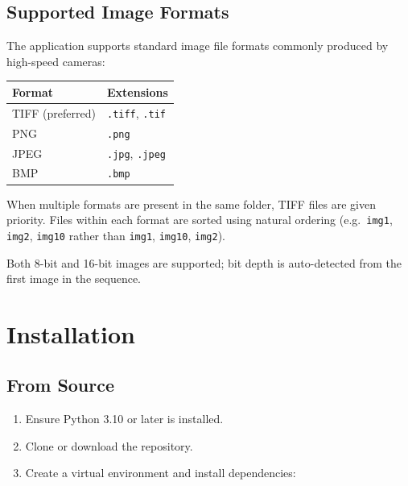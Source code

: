 \documentclass[11pt, letterpaper]{article}
\begin{document}
\subsection{Supported Image Formats}

The application supports standard image file formats commonly produced by
high-speed cameras:

\begin{center}
\begin{tabular}{ll}
    \toprule
    \textbf{Format} & \textbf{Extensions} \\
    \midrule
    TIFF (preferred) & \texttt{.tiff}, \texttt{.tif} \\
    PNG              & \texttt{.png} \\
    JPEG             & \texttt{.jpg}, \texttt{.jpeg} \\
    BMP              & \texttt{.bmp} \\
    \bottomrule
\end{tabular}
\end{center}

When multiple formats are present in the same folder, TIFF files are
given priority. Files within each format are sorted using natural ordering
(e.g.\ \texttt{img1}, \texttt{img2}, \texttt{img10} rather than
\texttt{img1}, \texttt{img10}, \texttt{img2}).

Both 8-bit and 16-bit images are supported; bit depth is auto-detected from
the first image in the sequence.


\section{Installation}

\subsection{From Source}

\begin{enumerate}
    \item Ensure Python 3.10 or later is installed.
    \item Clone or download the repository.
    \item Create a virtual environment and install dependencies:
\end{enumerate}
\end{document}
